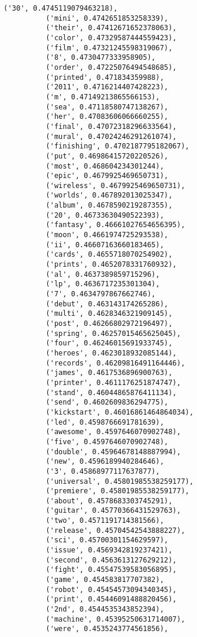 \documentclass[11pt]{article}
\begin{document}
\begin{Verbatim}[commandchars=\\\{\}]
          ('30', 0.4745119079463218),
          ('mini', 0.4742651853258339),
          ('their', 0.47412671652378063),
          ('color', 0.47329587444559423),
          ('film', 0.47321245598319067),
          ('8', 0.4730477333958905),
          ('order', 0.47225076494548685),
          ('printed', 0.471834359988),
          ('2011', 0.4716214407428223),
          ('m', 0.47149213865566153),
          ('sea', 0.47118580747138267),
          ('her', 0.47083606066660255),
          ('final', 0.47072318296633564),
          ('mural', 0.47024246291261074),
          ('finishing', 0.4702187795182067),
          ('put', 0.46986415720220526),
          ('most', 0.468604234301244),
          ('epic', 0.4679925469650731),
          ('wireless', 0.4679925469650731),
          ('worlds', 0.467892013025347),
          ('album', 0.4678590219287355),
          ('20', 0.46733630490522393),
          ('fantasy', 0.46661027654656395),
          ('moon', 0.4661974725293538),
          ('ii', 0.46607163660183465),
          ('cards', 0.4655718070254902),
          ('prints', 0.4652078331760932),
          ('al', 0.4637389859715296),
          ('lp', 0.4636717235301304),
          ('7', 0.4634797867662746),
          ('debut', 0.463143174265286),
          ('multi', 0.4628346321909145),
          ('post', 0.46266802972196497),
          ('spring', 0.46257015465625045),
          ('four', 0.46246015691933745),
          ('heroes', 0.4623018932085144),
          ('records', 0.46209816491164446),
          ('james', 0.4617536896900763),
          ('printer', 0.4611176251874747),
          ('stand', 0.46044865876411134),
          ('send', 0.4602609836294775),
          ('kickstart', 0.46016861464864034),
          ('led', 0.4598766691781639),
          ('awesome', 0.4597646070902748),
          ('five', 0.4597646070902748),
          ('double', 0.45964678148887994),
          ('new', 0.4596189940284646),
          ('3', 0.45868977117637877),
          ('universal', 0.45801985538259177),
          ('premiere', 0.45801985538259177),
          ('about', 0.4578683303745291),
          ('guitar', 0.45770366431529763),
          ('two', 0.4571191714381566),
          ('release', 0.45704542543888227),
          ('sci', 0.45700301154629597),
          ('issue', 0.4569342819237421),
          ('second', 0.4563613127629212),
          ('fight', 0.45547539583056895),
          ('game', 0.454583817707382),
          ('robot', 0.45454573094340345),
          ('print', 0.45446091488820456),
          ('2nd', 0.4544535343852394),
          ('machine', 0.45395250631714007),
          ('were', 0.4535243774561856),

\end{Verbatim}
\end{document}
